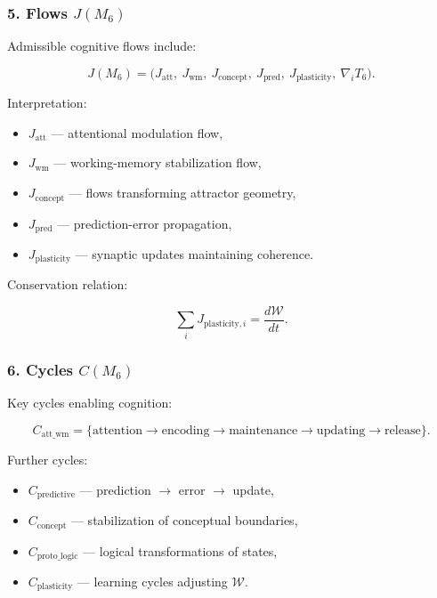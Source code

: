 \subsubsection*{5. Flows \texorpdfstring{$J(M_6)$}{J(M_6)}}

Admissible cognitive flows include:

\[
J(M_6) =
\big(
J_{\mathrm{att}},\
J_{\mathrm{wm}},\
J_{\mathrm{concept}},\
J_{\mathrm{pred}},\
J_{\mathrm{plasticity}},\
\nabla_i T_6
\big).
\]

Interpretation:

\begin{itemize}
    \item $J_{\mathrm{att}}$ — attentional modulation flow,
    \item $J_{\mathrm{wm}}$ — working-memory stabilization flow,
    \item $J_{\mathrm{concept}}$ — flows transforming attractor geometry,
    \item $J_{\mathrm{pred}}$ — prediction-error propagation,
    \item $J_{\mathrm{plasticity}}$ — synaptic updates maintaining coherence.
\end{itemize}

Conservation relation:

\[
\sum_i J_{\mathrm{plasticity},i} = \frac{d\mathcal{W}}{dt}.
\]

\subsubsection*{6. Cycles \texorpdfstring{$C(M_6)$}{C(M_6)}}

Key cycles enabling cognition:

\[
C_{\mathrm{att\_wm}}
= 
\{\text{attention} \to \text{encoding} \to 
\text{maintenance} \to \text{updating} \to \text{release}\}.
\]

Further cycles:

\begin{itemize}
    \item $C_{\mathrm{predictive}}$ — prediction $\to$ error $\to$ update,
    \item $C_{\mathrm{concept}}$ — stabilization of conceptual boundaries,
    \item $C_{\mathrm{proto\_logic}}$ — logical transformations of states,
    \item $C_{\mathrm{plasticity}}$ — learning cycles adjusting $\mathcal{W}$.
\end{itemize}

